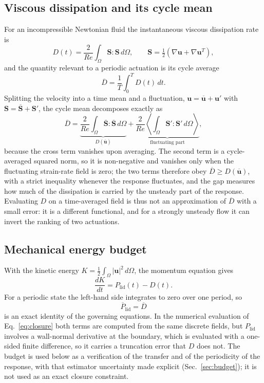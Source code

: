\documentclass[11pt,a4paper]{article}
\newcommand{\Dbar}{\overline{D}}
\newcommand{\Plid}{P_{\mathrm{lid}}}
\newcommand{\Sij}{\mathbf{S}}
\begin{document}
\subsection{Viscous dissipation and its cycle mean}
\label{sec:dissipation}

For an incompressible Newtonian fluid the instantaneous viscous dissipation rate is
\begin{equation}
D(t)=\frac{2}{Re}\int_\Omega \Sij:\Sij\,d\Omega,
\qquad
\Sij=\tfrac12\left(\nabla\mathbf{u}+\nabla\mathbf{u}^{T}\right),
\label{eq:diss}
\end{equation}
and the quantity relevant to a periodic actuation is its cycle average
\begin{equation}
\Dbar=\frac{1}{T}\int_0^T D(t)\,dt .
\label{eq:dbar}
\end{equation}
Splitting the velocity into a time mean and a fluctuation,
$\mathbf{u}=\overline{\mathbf{u}}+\mathbf{u}'$ with
$\Sij=\overline{\Sij}+\Sij'$, the cycle mean decomposes exactly as
\begin{equation}
\Dbar
= \underbrace{\frac{2}{Re}\int_\Omega \overline{\Sij}:\overline{\Sij}\,d\Omega}
_{D(\overline{\mathbf{u}})}
+ \underbrace{\frac{2}{Re}\left\langle\int_\Omega \Sij':\Sij'\,d\Omega\right\rangle}_{\text{fluctuating part}},
\label{eq:jensen}
\end{equation}
because the cross term vanishes upon averaging. The second term is a
cycle-averaged squared norm, so it is non-negative and vanishes only when the
fluctuating strain-rate field is zero; the two terms therefore obey
$\Dbar\ge D(\overline{\mathbf{u}})$, with a strict inequality whenever the
response fluctuates, and the gap measures
how much of the dissipation is carried by the unsteady part of the response.
Evaluating $D$ on a time-averaged field is thus not an approximation of
$\Dbar$ with a small error: it is a different functional, and for a strongly
unsteady flow it can invert the ranking of two actuations.

\subsection{Mechanical energy budget}

With the kinetic energy $K=\tfrac12\int_\Omega|\mathbf{u}|^2\,d\Omega$, the
momentum equation gives
\begin{equation}
\frac{dK}{dt}=\Plid(t)-D(t).
\label{eq:budget}
\end{equation}
For a periodic state the left-hand side integrates to zero over one period, so
\begin{equation}
\boxed{\ \overline{P}_{\mathrm{lid}}=\Dbar\ }
\label{eq:closure}
\end{equation}
is an exact identity of the governing equations. In the numerical evaluation of
Eq.~\eqref{eq:closure} both terms are computed from the same discrete fields, but
$\Plid$ involves a wall-normal derivative at the boundary, which is evaluated with
a one-sided finite difference, so it carries a truncation error that $D$
does not. The budget is used below as a verification of the transfer and of the
periodicity of the response, with that estimator uncertainty made explicit
(Sec.~\ref{sec:budget}); it is not used as an exact closure constraint.
\end{document}
